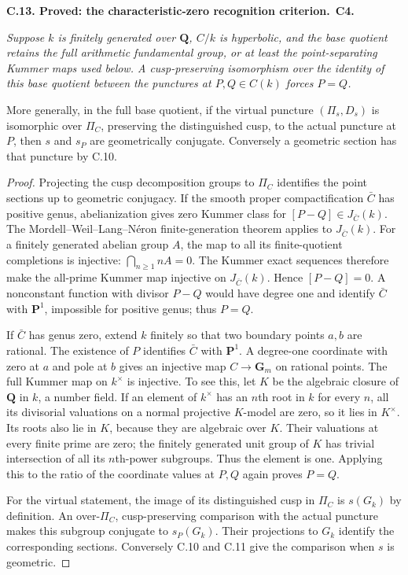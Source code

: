 \documentclass[11pt,a4paper]{article}
\newcommand{\Q}{\mathbf Q}
\newenvironment{claim}[3]{\par\medskip\noindent\hypertarget{#1}{\textbf{#1. #2.}}\ \textbf{#3.}\par\nopagebreak\smallskip\begingroup\itshape}{\endgroup\par\smallskip}
\begin{document}
\begin{claim}{C.13}{Proved: the characteristic-zero recognition criterion}{C4}
Suppose $k$ is finitely generated over $\Q$, $C/k$ is hyperbolic,
and the base quotient retains the full arithmetic fundamental group,
or at least the point-separating Kummer maps used below. A cusp-preserving
isomorphism over the identity of this base quotient between the
punctures at $P,Q\in C(k)$ forces $P=Q$.

More generally, in the full base quotient, if the virtual puncture
$(\Pi_s,D_s)$ is isomorphic over $\Pi_C$, preserving the distinguished
cusp, to the actual puncture at $P$, then $s$ and $s_P$ are geometrically
conjugate. Conversely a geometric section has that puncture by C.10.
\end{claim}
\begin{proof}
Projecting the cusp decomposition groups to $\Pi_C$ identifies the
point sections up to geometric conjugacy. If the smooth proper
compactification $\bar C$ has positive genus, abelianization gives
zero Kummer class for $[P-Q]\in J_{\bar C}(k)$. The
Mordell--Weil--Lang--N\'eron finite-generation theorem applies to
$J_{\bar C}(k)$. For a finitely generated
abelian group $A$, the map to all its finite-quotient completions is
injective: $\bigcap_{n\ge1}nA=0$. The Kummer exact sequences therefore
make the all-prime Kummer map injective on $J_{\bar C}(k)$. Hence $[P-Q]=0$.
A nonconstant function with divisor $P-Q$ would have degree one and
identify $\bar C$ with $\mathbf P^1$, impossible for positive genus; thus
$P=Q$.

If $\bar C$ has genus zero, extend $k$ finitely so that two boundary
points $a,b$ are rational. The existence of $P$ identifies $\bar C$
with $\mathbf P^1$. A degree-one coordinate with zero at $a$ and pole
at $b$ gives an injective map $C\to\mathbf G_m$ on rational points.
The full Kummer map on $k^\times$ is injective. To see this, let $K$
be the algebraic closure of $\Q$ in $k$, a number field. If an element
of $k^\times$ has an $n$th root in $k$ for every $n$, all its divisorial
valuations on a normal projective $K$-model are zero, so it lies in
$K^\times$. Its roots also lie in $K$, because they are algebraic over
$K$. Their valuations at every finite prime are zero; the finitely
generated unit group of $K$ has trivial intersection of all its
$n$th-power subgroups. Thus the element is one. Applying this to the
ratio of the coordinate values at $P,Q$ again proves $P=Q$.

For the virtual statement, the image of its distinguished cusp in
$\Pi_C$ is $s(G_k)$ by definition. An over-$\Pi_C$, cusp-preserving
comparison with the actual puncture makes this subgroup conjugate
to $s_P(G_k)$. Their projections to $G_k$ identify the corresponding
sections. Conversely C.10 and C.11 give the comparison when $s$
is geometric.
\end{proof}
\end{document}
